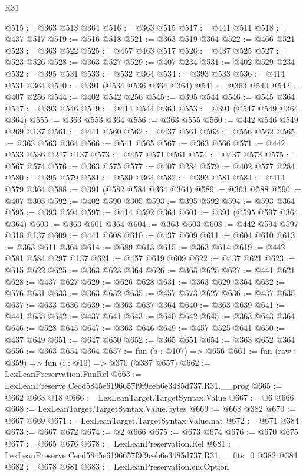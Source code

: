 \begin{lexlean}{R31}
\begin{coremodule}
@515 := @363 @513 @364
@516 := @363 @515
@517 := @441 @511
@518 := @437 @517
@519 := @516 @518
@521 := @363 @519 @364
@522 := @466 @521
@523 := @363 @522
@525 := @457 @463 @517
@526 := @437 @525
@527 := @523 @526
@528 := @363 @527
@529 := @407 @234
@531 := @402 @529 @234
@532 := @395 @531
@533 := @532 @364
@534 := @393 @533
@536 := @414 @531 @364
@540 := @391 (@534 @536 @364 @364)
@541 := @363 @540
@542 := @407 @256
@544 := @402 @542 @256
@545 := @395 @544
@546 := @545 @364
@547 := @393 @546
@549 := @414 @544 @364
@553 := @391 (@547 @549 @364 @364)
@555 := @363 @553 @364
@556 := @363 @555
@560 := @442 @546 @549 @269 @137
@561 := @441 @560
@562 := @437 @561
@563 := @556 @562
@565 := @363 @563 @364
@566 := @541 @565
@567 := @363 @566
@571 := @442 @533 @536 @247 @137
@573 := @457 @571 @561
@574 := @437 @573
@575 := @567 @574
@576 := @363 @575
@577 := @407 @284
@579 := @402 @577 @284
@580 := @395 @579
@581 := @580 @364
@582 := @393 @581
@584 := @414 @579 @364
@588 := @391 (@582 @584 @364 @364)
@589 := @363 @588
@590 := @407 @305
@592 := @402 @590 @305
@593 := @395 @592
@594 := @593 @364
@595 := @393 @594
@597 := @414 @592 @364
@601 := @391 (@595 @597 @364 @364)
@603 := @363 @601 @364
@604 := @363 @603
@608 := @442 @594 @597 @318 @137
@609 := @441 @608
@610 := @437 @609
@611 := @604 @610
@613 := @363 @611 @364
@614 := @589 @613
@615 := @363 @614
@619 := @442 @581 @584 @297 @137
@621 := @457 @619 @609
@622 := @437 @621
@623 := @615 @622
@625 := @363 @623 @364
@626 := @363 @625
@627 := @441 @621
@628 := @437 @627
@629 := @626 @628
@631 := @363 @629 @364
@632 := @576 @631
@633 := @363 @632
@635 := @457 @573 @627
@636 := @437 @635
@637 := @633 @636
@639 := @363 @637 @364
@640 := @363 @639
@641 := @441 @635
@642 := @437 @641
@643 := @640 @642
@645 := @363 @643 @364
@646 := @528 @645
@647 := @363 @646
@649 := @457 @525 @641
@650 := @437 @649
@651 := @647 @650
@652 := @365 @651
@654 := @363 @652 @364
@656 := @363 @654 @364
@657 := fun (b : @107) => @656
@661 := fun (raw : @359) => fun (i : @10) => @370 (@387 @657)
@662 := LexLeanPreservation.FunRel
@663 := LexLeanPreserve.Cecd5845e6196657f9f9ceb6e3485d737.R31.__prog
@665 := @662 @663 @18
@666 := LexLeanTarget.TargetSyntax.Value
@667 := @6 @666
@668 := LexLeanTarget.TargetSyntax.Value.bytes
@669 := @668 @382
@670 := @667 @669
@671 := LexLeanTarget.TargetSyntax.Value.nat
@672 := @671 @384
@673 := @667 @672
@674 := @2 @666
@675 := @673 @674
@676 := @670 @675
@677 := @665 @676
@678 := LexLeanPreservation.Rel
@681 := LexLeanPreserve.Cecd5845e6196657f9f9ceb6e3485d737.R31.__fits_0 @382 @384
@682 := @678 @681
@683 := LexLeanPreservation.encOption

\end{coremodule}
\end{lexlean}
